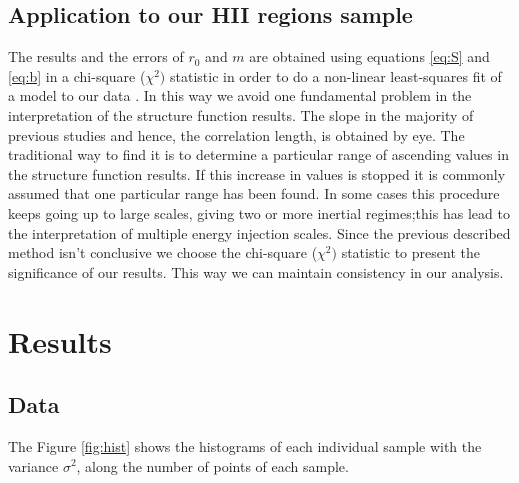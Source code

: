 \documentclass[fleqn,usenatbib, useAMS, a4paper]{mnras}
\begin{document}
\subsection{Application to our HII regions sample}\label{sec:apply}

The results and the errors of $r_{0}$ and $m$ are obtained using equations \ref{eq:S} and \ref{eq:b} in a chi-square (\(\chi^2)\) statistic in order to do a non-linear least-squares fit of a model to our data \citep{newville_matthew_2014_11813}. 
In this way we avoid one fundamental problem in the interpretation of the structure function results. The slope in the majority of previous studies and hence, the correlation length, is obtained by eye. 
The traditional way to find it is to determine a particular range of ascending values in the structure function results. 
If this increase in values is stopped it is commonly assumed that one particular range has been found. 
In some cases this procedure keeps going up to large scales, giving two or more inertial regimes;this has lead to the interpretation of multiple energy injection scales.
Since the previous described method isn't conclusive we choose the chi-square (\(\chi^2)\) statistic to present the significance of our results. 
This way we can maintain consistency in our analysis.


\section{Results}\label{sec:results}

\subsection{Data}

The Figure \ref{fig:hist} shows the histograms of each individual sample with the variance  \(\sigma^{2}\), along the number of points of each sample.
\end{document}
